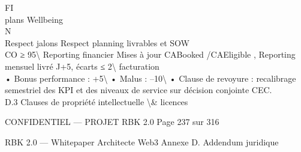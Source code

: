 \documentclass[12pt,landscape,a4paper]{article}
\newenvironment{confidential}
{\begin{tcolorbox}[
    colback=rbkred!5!white,
    colframe=rbkred!75!black,
    title=CONFIDENTIEL,
    fonttitle=\bfseries\color{white},
    coltitle=rbkred!75!black,
    breakable,
    enhanced,
    frame hidden,
    borderline west={2pt}{0pt}{rbkred!75!black}
]}
{\end{tcolorbox}}
\begin{document}
\vspace{0.5em}
\vspace{0.5em}
\vspace{0.5em}
\vspace{0.5em}
FI\\
plans Wellbeing\\
\vspace{0.5em}
\vspace{0.5em}
\vspace{0.5em}
N\\
Respect jalons                Respect planning livrables et SOW\\
CO                            ≥ 95\textbackslash{}%
Reporting financier           Mises à jour CABooked /CAEligible ,    Reporting mensuel livré J+5, écarts ≤ 2\textbackslash{}%
facturation\\
\vspace{0.5em}
\vspace{0.5em}
• Bonus performance : +5\textbackslash{}%
\vspace{0.5em}
• Malus : –10\textbackslash{}%
\vspace{0.5em}
• Clause de revoyure : recalibrage semestriel des KPI et des niveaux de service sur décision conjointe CEC.\\
\vspace{0.5em}
\vspace{0.5em}
\vspace{0.5em}
D.3 Clauses de propriété intellectuelle \textbackslash{}& licences\\
\vspace{0.5em}
\vspace{0.5em}
\vspace{0.5em}
\begin{confidential}CONFIDENTIEL — PROJET RBK 2.0                                              Page 237 sur 316\end{confidential}
RBK 2.0 — Whitepaper Architecte Web3                                                                                                  Annexe D. Addendum juridique\\
\end{document}
